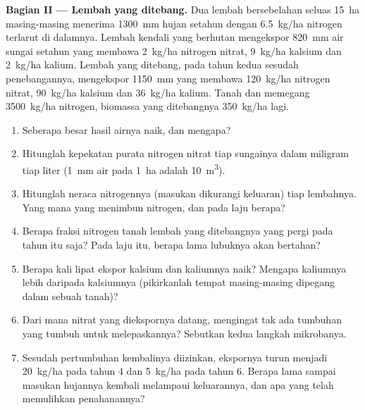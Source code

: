 \begin{problem}
\medskip
\noindent\textbf{Bagian II --- Lembah yang ditebang.}
Dua lembah bersebelahan seluas \qty{15}{ha} masing-masing menerima
\qty{1300}{mm} hujan setahun dengan \qty{6.5}{kg/ha} nitrogen terlarut
di dalamnya. Lembah kendali yang berhutan mengekspor \qty{820}{mm} air
sungai setahun yang membawa \qty{2}{kg/ha} nitrogen nitrat,
\qty{9}{kg/ha} kalsium dan \qty{2}{kg/ha} kalium. Lembah yang ditebang,
pada tahun kedua sesudah penebangannya, mengekspor \qty{1150}{mm} yang
membawa \qty{120}{kg/ha} nitrogen nitrat, \qty{90}{kg/ha} kalsium dan
\qty{36}{kg/ha} kalium. Tanah dan  memegang
\qty{3500}{kg/ha} nitrogen, biomassa yang ditebangnya \qty{350}{kg/ha}
lagi.
\begin{enumerate}[resume]
  \item Seberapa besar hasil airnya naik, dan mengapa?
  \item Hitunglah kepekatan purata nitrogen nitrat tiap sungainya
        dalam miligram tiap liter (\qty{1}{mm} air pada \qty{1}{ha} adalah
        \qty{10}{m^3}).
  \item Hitunglah neraca nitrogennya (masukan dikurangi keluaran) tiap
        lembahnya. Yang mana yang menimbun nitrogen, dan pada laju
        berapa?
  \item Berapa fraksi nitrogen tanah lembah yang ditebangnya yang
        pergi pada tahun itu saja? Pada laju itu, berapa lama lubuknya
        akan bertahan?
  \item Berapa kali lipat ekspor kalsium dan kaliumnya naik? Mengapa
        kaliumnya lebih daripada kalsiumnya (pikirkanlah tempat
        masing-masing dipegang dalam sebuah tanah)?
  \item Dari mana nitrat yang diekspornya datang, mengingat tak ada
        tumbuhan yang tumbuh untuk melepaskannya? Sebutkan kedua
        langkah mikrobanya.
  \item Sesudah pertumbuhan kembalinya diizinkan, ekspornya turun
        menjadi \qty{20}{kg/ha} pada tahun 4 dan \qty{5}{kg/ha} pada
        tahun 6. Berapa lama sampai masukan hujannya kembali melampaui
        keluarannya, dan apa yang telah memulihkan penahanannya?
\end{enumerate}


\end{problem}
